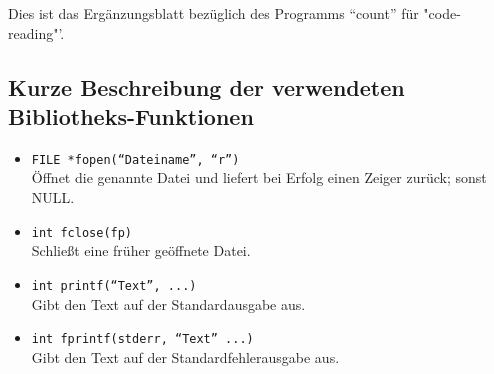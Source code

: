
Dies ist das Erg\"anzungsblatt bez\"uglich des Programms "`count"'
f\"ur "code-reading"'.

\subsection*{Kurze Beschreibung der verwendeten Bibliotheks-Funktionen}

\begin{itemize}

        \item {\tt FILE *fopen(``Dateiname'', ``r'')}\\
                \"Offnet die genannte Datei und liefert bei Erfolg
		einen Zeiger zur\"uck; sonst NULL.

        \item {\tt int fclose(fp)}\\
                Schlie{\ss}t eine fr\"uher ge\"offnete Datei.

        \item {\tt int printf(``Text'', ...)}\\
                Gibt den Text auf der Standardausgabe aus.

        \item {\tt int fprintf(stderr, ``Text'' ...)}\\
                Gibt den Text auf der Standardfehlerausgabe aus.

\end{itemize}

